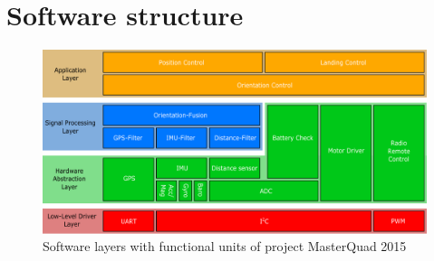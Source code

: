 \chapter{Software structure}
\label{sec:software}


\begin{figure}[H]
    \centering
    \includegraphics[width=\textwidth]{fig/ch-software-structure/Software_structure}
    \caption{Software layers with functional units of project MasterQuad 2015}
    \label{fig:layer:layer_graph}
\end{figure}

